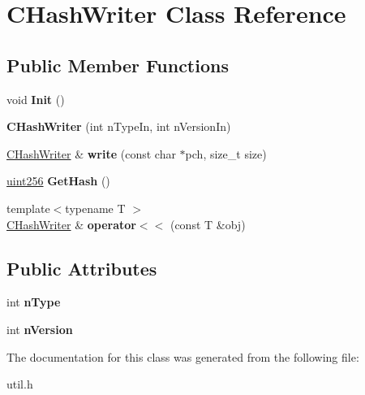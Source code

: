 \hypertarget{class_c_hash_writer}{}\section{C\+Hash\+Writer Class Reference}
\label{class_c_hash_writer}
\subsection*{Public Member Functions}
\begin{DoxyCompactItemize}
\item 
\mbox{\label{class_c_hash_writer_a941361586006cbb4c8eca534bb4bce4c}} 
void {\bfseries Init} ()
\item 
\mbox{\label{class_c_hash_writer_a81ce9a497a72fcb6b2612efdc20efbc9}} 
{\bfseries C\+Hash\+Writer} (int n\+Type\+In, int n\+Version\+In)
\item 
\mbox{\label{class_c_hash_writer_a779360281eeeb4cc7485c8acae649bc9}} 
\mbox{\hyperlink{class_c_hash_writer}{C\+Hash\+Writer}} \& {\bfseries write} (const char $\ast$pch, size\+\_\+t size)
\item 
\mbox{\label{class_c_hash_writer_ae94a937211502eabf19477630090093a}} 
\mbox{\hyperlink{classuint256}{uint256}} {\bfseries Get\+Hash} ()
\item 
\mbox{\label{class_c_hash_writer_a6551aed7315be5ba750680df18562f3a}} 
{\footnotesize template$<$typename T $>$ }\\\mbox{\hyperlink{class_c_hash_writer}{C\+Hash\+Writer}} \& {\bfseries operator$<$$<$} (const T \&obj)
\end{DoxyCompactItemize}
\subsection*{Public Attributes}
\begin{DoxyCompactItemize}
\item 
\mbox{\label{class_c_hash_writer_ae8fe02b05db26a2647a7aeee035f022f}} 
int {\bfseries n\+Type}
\item 
\mbox{\label{class_c_hash_writer_ad7d3642addab58385476dc0f9d55fa58}} 
int {\bfseries n\+Version}
\end{DoxyCompactItemize}


The documentation for this class was generated from the following file\+:\begin{DoxyCompactItemize}
\item 
util.\+h\end{DoxyCompactItemize}
